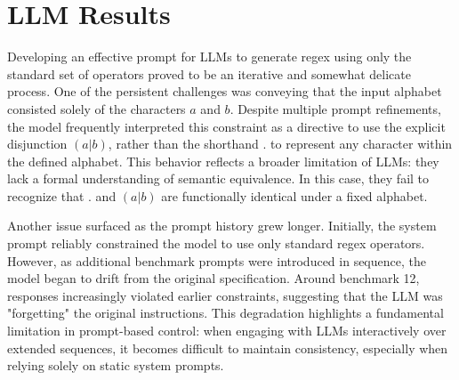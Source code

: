 



\section{LLM Results}

\indent\indent Developing an effective prompt for LLMs to generate regex using only the standard set of operators proved to be an iterative and somewhat delicate process. One of the persistent challenges was conveying that the input alphabet consisted solely of the characters $a$ and $b$. Despite multiple prompt refinements, the model frequently interpreted this constraint as a directive to use the explicit disjunction $(a|b)$, rather than the shorthand $.$ to represent any character within the defined alphabet. This behavior reflects a broader limitation of LLMs: they lack a formal understanding of semantic equivalence. In this case, they fail to recognize that $.$ and $(a|b)$ are functionally identical under a fixed alphabet.

\indent\indent Another issue surfaced as the prompt history grew longer. Initially, the system prompt reliably constrained the model to use only standard regex operators. However, as additional benchmark prompts were introduced in sequence, the model began to drift from the original specification. Around benchmark 12, responses increasingly violated earlier constraints, suggesting that the LLM was "forgetting" the original instructions. This degradation highlights a fundamental limitation in prompt-based control: when engaging with LLMs interactively over extended sequences, it becomes difficult to maintain consistency, especially when relying solely on static system prompts.

